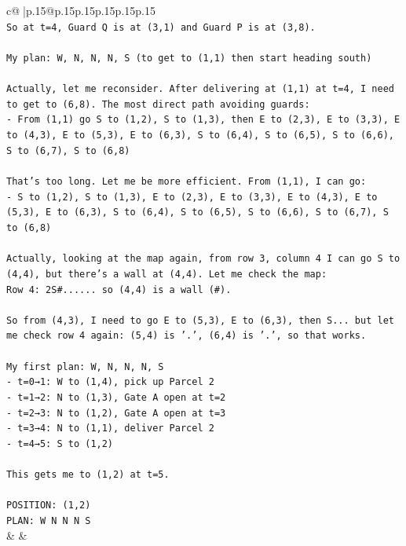 \documentclass{article}
\begin{document}
{\begin{supertabular}{c@{$\;$}|p{.15\linewidth}@{}p{.15\linewidth}p{.15\linewidth}p{.15\linewidth}p{.15\linewidth}p{.15\linewidth}}
{{{\\ 
\texttt{So at t=4, Guard Q is at (3,1) and Guard P is at (3,8).} \\
\\ 
\texttt{My plan: W, N, N, N, S (to get to (1,1) then start heading south)} \\
\\ 
\texttt{Actually, let me reconsider. After delivering at (1,1) at t=4, I need to get to (6,8). The most direct path avoiding guards:} \\
\texttt{{-} From (1,1) go S to (1,2), S to (1,3), then E to (2,3), E to (3,3), E to (4,3), E to (5,3), E to (6,3), S to (6,4), S to (6,5), S to (6,6), S to (6,7), S to (6,8)} \\
\\ 
\texttt{That's too long. Let me be more efficient. From (1,1), I can go:} \\
\texttt{{-} S to (1,2), S to (1,3), E to (2,3), E to (3,3), E to (4,3), E to (5,3), E to (6,3), S to (6,4), S to (6,5), S to (6,6), S to (6,7), S to (6,8)} \\
\\ 
\texttt{Actually, looking at the map again, from row 3, column 4 I can go S to (4,4), but there's a wall at (4,4). Let me check the map:} \\
\texttt{Row 4: 2S\#...... so (4,4) is a wall (\#).} \\
\\ 
\texttt{So from (4,3), I need to go E to (5,3), E to (6,3), then S... but let me check row 4 again: (5,4) is '.', (6,4) is '.', so that works.} \\
\\ 
\texttt{My first plan: W, N, N, N, S} \\
\texttt{{-} t=0→1: W to (1,4), pick up Parcel 2} \\
\texttt{{-} t=1→2: N to (1,3), Gate A open at t=2} \\
\texttt{{-} t=2→3: N to (1,2), Gate A open at t=3} \\
\texttt{{-} t=3→4: N to (1,1), deliver Parcel 2} \\
\texttt{{-} t=4→5: S to (1,2)} \\
\\ 
\texttt{This gets me to (1,2) at t=5.} \\
\\ 
\texttt{POSITION: (1,2)} \\
\texttt{PLAN: W N N N S} \\
            }
        }
    }
    & & \\ \\


\end{supertabular}}
\end{document}
